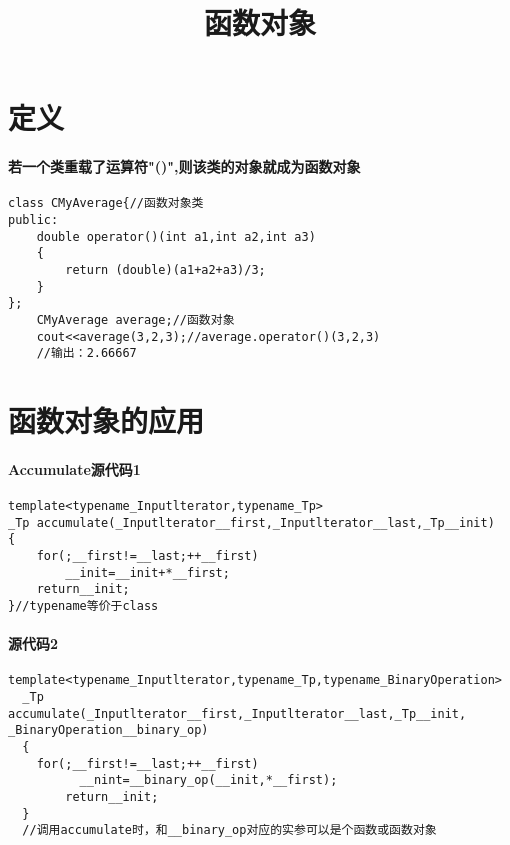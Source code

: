 \documentclass{article}
\begin{document}
\begin{CJK}{UTF8}{gbsn}
\title{函数对象}
\date{}
\maketitle
\section{定义}
\paragraph{若一个类重载了运算符"()",则该类的对象就成为函数对象}
\begin{verbatim}
class CMyAverage{//函数对象类
public:
	double operator()(int a1,int a2,int a3)
	{
		return (double)(a1+a2+a3)/3;
	}
};
	CMyAverage average;//函数对象
	cout<<average(3,2,3);//average.operator()(3,2,3)
	//输出：2.66667
\end{verbatim}
\section{函数对象的应用}
\paragraph{Accumulate源代码1}
\begin{verbatim}
template<typename_Inputlterator,typename_Tp>
_Tp accumulate(_Inputlterator__first,_Inputlterator__last,_Tp__init)
{
	for(;__first!=__last;++__first)
		__init=__init+*__first;
	return__init;
}//typename等价于class
\end{verbatim}
\paragraph{源代码2}
\begin{verbatim}
template<typename_Inputlterator,typename_Tp,typename_BinaryOperation>
  _Tp  accumulate(_Inputlterator__first,_Inputlterator__last,_Tp__init,  _BinaryOperation__binary_op)
  {
  	for(;__first!=__last;++__first)
  	      __nint=__binary_op(__init,*__first);
  	    return__init;
  }
  //调用accumulate时，和__binary_op对应的实参可以是个函数或函数对象
\end{verbatim}

\end{CJK}
\end{document}
